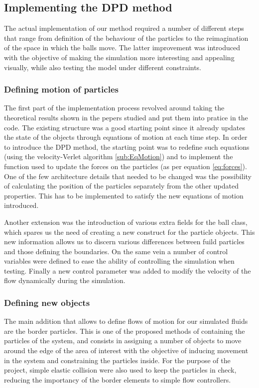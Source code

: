 \documentclass[]{usiinfbachelorproject}
\begin{document}
\newpage

\subsection{Implementing the DPD method}
The actual implementation of our method required a number of different steps 
that range from definition of the behaviour of the particles to the reimagination 
of the space in which the balls move. The latter improvement was introduced with the objective 
of making the simulation more interesting and appealing visually, while also testing the 
model under different constraints.

\subsubsection{Defining motion of particles}
The first part of the implementation process revolved around taking the theoretical 
results shown in the pepers studied and put them into pratice in the code. The existing structure 
was a good starting point since it already updates the state of the objects through equations 
of motion at each time step. In order to introduce the DPD method, the starting point was to 
redefine such equations (using the velocity-Verlet algorithm \ref{sub:EqMotion}) and to 
implement the function used to update the forces on the particles (as per equation \ref{eq:forces}). 
One of the few architecture details that needed to be changed was the possibility of calculating the position 
of the particles separately from the other updated properties. This has to be implemented to 
satisfy the new equations of motion introduced.

Another extension was the introduction of various extra fields for the ball class, which spares us the need 
of creating a new construct for the particle objects. This new information allows us to discern various 
differences between fuild particles and those defining the boundaries. On the same vein a number of control variables 
were defined to ease the ability of controlling the simulation when testing. Finally a new control parameter was added 
to modify the velocity of the flow dynamically during the simulation.

\subsubsection{Defining new objects}
The main addition that allows to define flows of motion for our simulated fluids are the border particles.
This is one of the proposed methods of containing the particles of the system, and consists in assigning a number of 
objects to move around the edge of the area of interest with the objective of inducing movement in the system and 
constraining the particles inside. For the purpose of the project, simple elastic collision were also used to keep 
the particles in check, reducing the importancy of the border elements to simple flow controllers.
\end{document}

